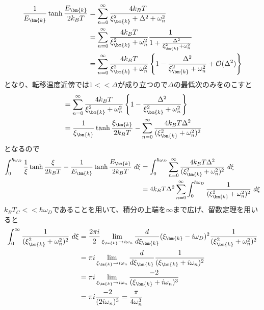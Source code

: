 \documentclass[dvipdfmx, 11pt, a4paper]{jsarticle}
\numberwithin{equation}{section}
\theoremstyle{definition}
\begin{document}
\begin{derivationBox}
\begin{align}
            \frac{1}{E_{\bm{k}}} \tanh \frac{ E_{\bm{k}}}{2k_B T} &= \sum_{n=0}^\infty \frac{4k_BT}{\xi_{\bm{k}}^2 + \Delta^2 + \omega_n^2} \notag \\
            &= \sum_{n=0}^\infty \frac{4k_BT}{\xi_{\bm{k}}^2 + \omega_n^2} \frac{1}{1 + \frac{\Delta^2}{\xi_{\bm{k}}^2 + \omega_n^2}} \notag \\
            &= \sum_{n=0}^\infty \frac{4k_BT}{\xi_{\bm{k}}^2 + \omega_n^2} \left\{ 1 - \frac{\Delta^2}{\xi_{\bm{k}}^2 + \omega_n^2} + \mathcal{O}(\Delta^2) \right\}
        \end{align}
        となり、転移温度近傍では$1<<\Delta$が成り立つので$\Delta$の最低次のみをのこすと
        \begin{align}
            &=\sum_{n=0}^\infty \frac{4k_BT}{\xi_{\bm{k}}^2 + \omega_n^2} \left\{ 1 - \frac{\Delta^2}{\xi_{\bm{k}}^2 + \omega_n^2}  \right\} \notag \\
            &= \frac{1}{\xi_{\bm{k}}} \tanh \frac{\xi_{\bm{k}}}{2k_BT} - \sum_{n=0}^\infty \frac{4k_BT\Delta^2}{(\xi_{\bm{k}}^2 + \omega_n^2)^2}  
        \end{align}
        となるので
        \begin{align}
            \int_{0}^{\hbar \omega_D}   \frac{1}{\xi} \tanh \frac{ \xi}{2k_B T} -   \frac{1}{E_{\bm{k}}} \tanh \frac{ E_{\bm{k}}}{2k_B T}\  d\xi &= \int_{0}^{\hbar \omega_D} \sum_{n=0}^\infty \frac{4k_BT\Delta^2}{(\xi_{\bm{k}}^2 + \omega_n^2)^2}\ d\xi  \notag \\
            &=  4k_BT\Delta^2\sum_{n=0}^\infty \int_{0}^{\hbar \omega_D}\frac{1}{(\xi_{\bm{k}}^2 + \omega_n^2)^2}\ d\xi
        \end{align}
        $k_BT_C << \hbar \omega_D$であることを用いて、積分の上端を$\infty$まで広げ、留数定理を用いると
        \begin{align}
            \int_{0}^{\infty}\frac{1}{(\xi_{\bm{k}}^2 + \omega_n^2)^2}\ d\xi &= \frac{2\pi i}{2} \lim_{\xi_{\bm{k}} \rightarrow i\omega_n} \frac{d}{d\xi_{\bm{k}}} (\xi_{\bm{k}} - i\omega_D)^2 \frac{1}{(\xi_{\bm{k}}^2 + \omega_n^2)^2} \notag \\
            &= \pi i \lim_{\xi_{\bm{k}} \rightarrow i\omega_n} \frac{d}{d\xi_{\bm{k}}} \frac{1}{(\xi_{\bm{k}} + i\omega_n)^2}  \notag \\
            &= \pi i \lim_{\xi_{\bm{k}} \rightarrow i\omega_n}  \frac{-2}{(\xi_{\bm{k}} + i\omega_n)^3} \notag \\
            &= \pi i \frac{-2}{(2i\omega_n)^3} = \frac{\pi}{4\omega_n^3}
        \end{align}

\end{derivationBox}
\end{document}
